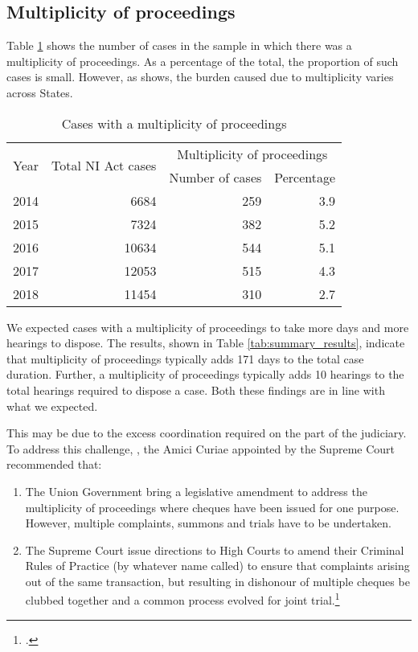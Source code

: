 \subsection{Multiplicity of proceedings}
\label{sec:mult-proc}

Table \ref{tab:mult_yearWise} shows the number of cases in the sample in which there was a multiplicity of proceedings. As a percentage of the total, the proportion of such cases is small. However, as  shows, the burden caused due to multiplicity varies across States.

\begin{longtable}[h!]{@{}lrrr@{}}
 \caption{Cases with a multiplicity of proceedings}\label{tab:mult_yearWise}\\
\toprule
\multirow{2}{*}{Year} & \multirow{2}{*}{Total NI Act cases} & \multicolumn{2}{c}{Multiplicity of proceedings}\\
\cmidrule{3-4}
&& Number of cases & Percentage \\
\midrule\endhead
2014 & 6684 & 259 & 3.9 \\
2015 & 7324 & 382 & 5.2 \\
2016 & 10634 & 544 & 5.1 \\
2017 & 12053 & 515 & 4.3 \\
2018 & 11454 & 310 & 2.7 \\
\bottomrule
\end{longtable}

We expected cases with a multiplicity of proceedings to take more days and more hearings to dispose. The results, shown in Table \ref{tab:summary_results}, indicate that multiplicity of proceedings typically adds 171 days to the total case duration. Further, a multiplicity of proceedings typically adds 10 hearings to the total hearings required to dispose a case. Both these findings are in line with what we expected.

This may be due to the excess coordination required on the part of the judiciary. To address this challenge, , the Amici Curiae appointed by the Supreme Court recommended that:

\begin{enumerate}
 \item The Union Government bring a legislative amendment to address the multiplicity of proceedings where cheques have been issued for one purpose. However, multiple complaints, summons and trials have to be undertaken. 
 \item The Supreme Court issue directions to High Courts to amend their Criminal Rules of Practice (by whatever name called) to ensure that complaints arising out of the same transaction, but resulting in dishonour of multiple cheques be clubbed together and a common process evolved for joint trial.\footcite{amicus2020_submission}
\end{enumerate}

